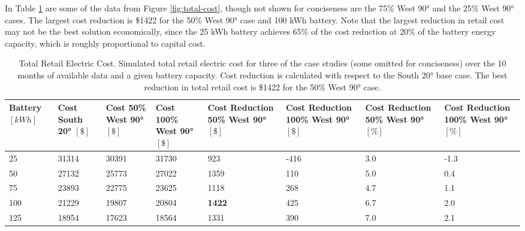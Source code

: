 \documentclass[journal,article,submit,pdftex,moreauthors]{Definitions/mdpi}
\begin{document}
In Table \ref{tab:total-cost} are some of the data from Figure \ref{fig:total-cost}, though not shown for conciseness are the 75\% West 90° and the 25\% West 90° cases. The largest cost reduction is \$1422 for the 50\% West 90° case and 100 kWh battery. Note that the largest reduction in retail cost may not be the best solution economically, since the 25 kWh battery achieves 65\% of the cost reduction at 20\% of the battery energy capacity, which is roughly proportional to capital cost.

\begin{table}[!h]
  \centering
  \caption{Total Retail Electric Cost. Simulated total retail electric cost for three of the case studies (some omitted for conciseness) over the 10 months of available data and a given battery capacity. Cost reduction is calculated with respect to the South 20° base case. The best reduction in total retail cost is \$1422 for the 50\% West 90° case.}
  \label{tab:total-cost}
  \begin{tabularx}{\textwidth}{XXXXXXXX}
    \toprule
    Battery $[kWh]$ & Cost South 20° $[\$]$ & Cost 50\% West 90° $[\$]$ & Cost 100\% West 90° $[\$]$ & Cost Reduction 50\% West 90° $[\$]$ & Cost Reduction 100\% West 90° $[\$]$ & Cost Reduction 50\% West 90° $[\%]$ & Cost Reduction 100\% West 90° $[\%]$ \\
    \midrule
    25              & 31314                 & 30391                     & 31730                      & 923                                 & -416                                 & 3.0                                 & -1.3                                 \\
    50              & 27132                 & 25773                     & 27022                      & 1359                                & 110                                  & 5.0                                 & 0.4                                  \\
    75              & 23893                 & 22775                     & 23625                      & 1118                                & 268                                  & 4.7                                 & 1.1                                  \\
    100             & 21229                 & 19807                     & 20804                      & \textbf{1422}                       & 425                                  & 6.7                                 & 2.0                                  \\
    125             & 18954                 & 17623                     & 18564                      & 1331                                & 390                                  & 7.0                                 & 2.1                                  \\

\end{tabularx}
\end{table}
\end{document}
